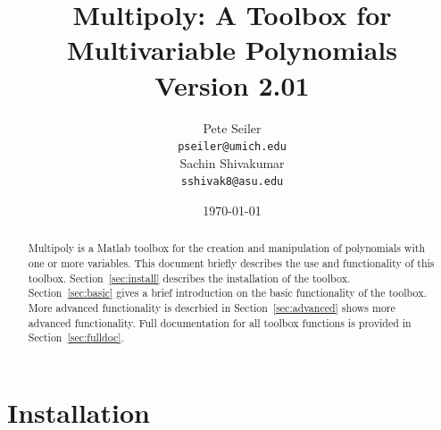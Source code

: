 \documentclass{article}
\begin{document}
\title{Multipoly: A Toolbox for Multivariable Polynomials \\ Version 2.01}
\author{Pete Seiler \\ \texttt{pseiler@umich.edu} \\[5mm] Sachin Shivakumar \\ \texttt{sshivak8@asu.edu}}
\date{\today}
\maketitle

\begin{abstract}

  Multipoly is a Matlab toolbox for the creation and manipulation of
  polynomials with one or more variables.  This document briefly
  describes the use and functionality of this toolbox.
  Section~\ref{sec:install} describes the installation of the toolbox.
  Section~\ref{sec:basic} gives a brief introduction on the basic
  functionality of the toolbox. More advanced functionality is
  descrbied in Section~\ref{sec:advanced} shows more advanced
  functionality.  Full documentation for all toolbox functions is
  provided in Section~\ref{sec:fulldoc}.

\end{abstract}

\section{Installation}
\label{sec:install}
\end{document}
